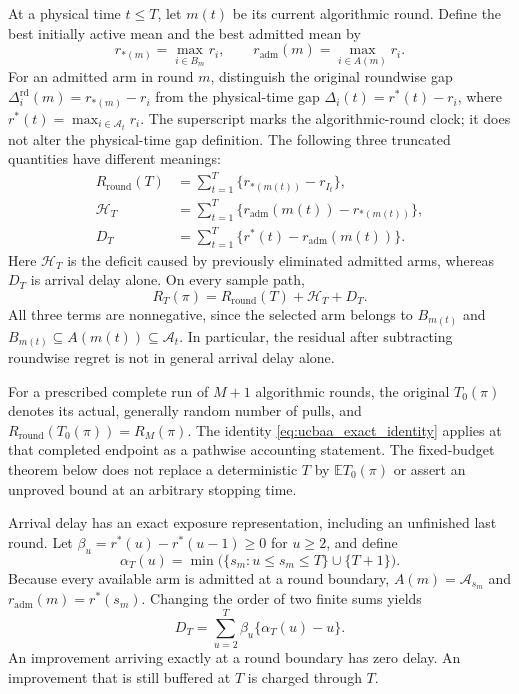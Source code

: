 At a physical time $t\le T$, let $m(t)$ be its current algorithmic round.
Define the best initially active mean and the best admitted mean by
\[
 r_{*(m)}=\max_{i\in B_m}r_i,\qquad
 r_{\mathrm{adm}}(m)=\max_{i\in A(m)}r_i.
\]
For an admitted arm in round $m$, distinguish the original roundwise gap
$\Delta_i^{\mathrm{rd}}(m)=r_{*(m)}-r_i$ from the physical-time gap
$\Delta_i(t)=r^*(t)-r_i$, where
$r^*(t)=\max_{i\in\mathcal A_t}r_i$. The superscript marks the
algorithmic-round clock; it does not alter the physical-time gap definition.
The following three truncated quantities have different meanings:
\begin{align}
 R_{\mathrm{round}}(T)
  &=\sum_{t=1}^T\{r_{*(m(t))}-r_{I_t}\},\nonumber\\
 \mathcal H_T
  &=\sum_{t=1}^T\{r_{\mathrm{adm}}(m(t))-r_{*(m(t))}\},\nonumber\\
 D_T
  &=\sum_{t=1}^T\{r^*(t)-r_{\mathrm{adm}}(m(t))\}.
 \label{eq:ucbaa_three_terms}
\end{align}
Here $\mathcal H_T$ is the deficit caused by previously eliminated admitted arms,
whereas $D_T$ is arrival delay alone. On every sample path,
\begin{equation}
 R_T(\pi)=R_{\mathrm{round}}(T)+\mathcal H_T+D_T.
 \label{eq:ucbaa_exact_identity}
\end{equation}
All three terms are nonnegative, since the selected arm belongs to $B_{m(t)}$
and $B_{m(t)}\subseteq A(m(t))\subseteq\mathcal A_t$.
In particular, the residual after subtracting roundwise regret is not in
general arrival delay alone.

For a prescribed complete run of $M+1$ algorithmic rounds, the original
$T_0(\pi)$ denotes its actual, generally random number of pulls, and
$R_{\mathrm{round}}(T_0(\pi))=R_M(\pi)$. The identity
\eqref{eq:ucbaa_exact_identity} applies at that completed endpoint as a
pathwise accounting statement. The fixed-budget theorem below does not
replace a deterministic $T$ by $\mathbb E T_0(\pi)$ or assert an
unproved bound at an arbitrary stopping time.

Arrival delay has an exact exposure representation, including an unfinished
last round. Let $\beta_u=r^*(u)-r^*(u-1)\ge0$ for $u\ge2$, and define
\[
 \alpha_T(u)=\min\bigl(\{s_m:u\le s_m\le T\}\cup\{T+1\}\bigr).
\]
Because every available arm is admitted at a round boundary,
$A(m)=\mathcal A_{s_m}$ and $r_{\mathrm{adm}}(m)=r^*(s_m)$.
Changing the order of two finite sums yields
\begin{equation}
 D_T=\sum_{u=2}^T\beta_u\{\alpha_T(u)-u\}.
 \label{eq:ucbaa_delay_exposure}
\end{equation}
An improvement arriving exactly at a round boundary has zero delay.
An improvement that is still buffered at $T$ is charged through $T$.

